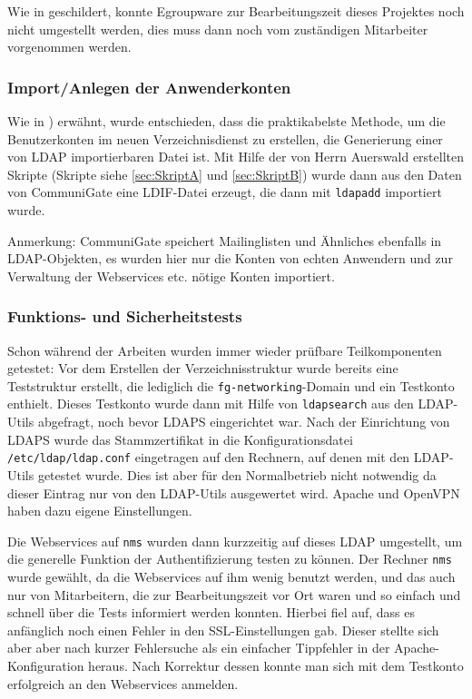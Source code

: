\documentclass[11pt,a4paper,titlepage=firstiscover,headsepline,bibtotoc]{scrartcl} %
\begin{document}
Wie in  geschildert, konnte Egroupware zur Bearbeitungszeit dieses Projektes noch nicht umgestellt werden, dies muss dann noch vom zuständigen Mitarbeiter vorgenommen werden.

\subsubsection{Import/Anlegen der Anwenderkonten}
Wie in ) erwähnt, wurde entschieden, dass die praktikabelste Methode, um die Benutzerkonten im neuen Verzeichnisdienst zu erstellen, die Generierung einer von LDAP importierbaren Datei ist. Mit Hilfe der von Herrn Auerswald erstellten Skripte (Skripte siehe \autoref{sec:SkriptA} und \autoref{sec:SkriptB}) wurde dann aus den Daten von CommuniGate eine LDIF-Datei erzeugt, die dann mit \texttt{ldapadd} importiert wurde.

Anmerkung: CommuniGate speichert Mailinglisten und Ähnliches ebenfalls in LDAP-Objekten, es wurden hier nur die Konten von echten Anwendern und zur Verwaltung der Webservices etc. nötige Konten importiert.

\subsubsection{Funktions- und Sicherheitstests}
Schon während der Arbeiten wurden immer wieder prüfbare Teilkomponenten getestet: 
Vor dem Erstellen der Verzeichnisstruktur wurde bereits eine Teststruktur erstellt, die lediglich die \texttt{fg-networking}-Domain und ein Testkonto enthielt. Dieses Testkonto wurde dann mit Hilfe von \texttt{ldapsearch} aus den LDAP-Utils abgefragt, noch bevor LDAPS eingerichtet war. Nach der Einrichtung von LDAPS wurde das Stammzertifikat in die Konfigurationsdatei \texttt{/etc/ldap/ldap.conf} eingetragen auf den Rechnern, auf denen mit den LDAP-Utils getestet wurde. Dies ist aber für den Normalbetrieb nicht notwendig da dieser Eintrag nur von den LDAP-Utils ausgewertet wird. Apache und OpenVPN haben dazu eigene Einstellungen.

Die Webservices auf \texttt{nms} wurden dann kurzzeitig auf dieses LDAP umgestellt, um die generelle Funktion der Authentifizierung testen zu können. Der Rechner \texttt{nms} wurde gewählt, da die Webservices auf ihm wenig benutzt werden, und das auch nur von Mitarbeitern, die zur Bearbeitungszeit vor Ort waren und so einfach und schnell über die Tests informiert werden konnten. Hierbei fiel auf, dass es anfänglich noch einen Fehler in den SSL-Einstellungen gab. Dieser stellte sich aber aber nach kurzer Fehlersuche als ein einfacher Tippfehler in der Apache-Konfiguration heraus. Nach Korrektur dessen konnte man sich mit dem Testkonto erfolgreich an den Webservices anmelden.
\end{document}
